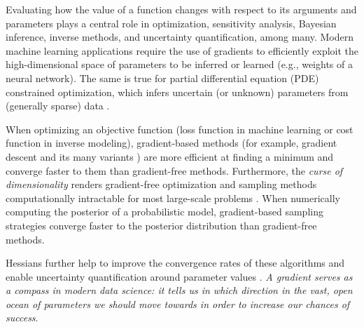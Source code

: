 % 
Evaluating how the value of a function changes with respect to its arguments and parameters plays a central role in optimization, sensitivity analysis, Bayesian inference, inverse methods, and uncertainty quantification, among many\cite{Razavi.2021}. 
Modern machine learning applications require the use of gradients to efficiently exploit  the high-dimensional space of parameters to be inferred or learned (e.g., weights of a neural network). 
The same is true for partial differential equation (PDE) constrained optimization, which infers uncertain (or unknown) parameters from (generally sparse) data  \cite{Ghattas.2021}.

When optimizing an objective function (loss function in machine learning or cost function in inverse modeling), gradient-based methods (for example, gradient descent and its many variants \cite{ruder2016overview-gradient-descent}) are more efficient at finding a minimum and converge faster to them than gradient-free methods.
Furthermore, the \textit{curse of dimensionality} renders gradient-free optimization and sampling methods computationally intractable for most large-scale problems \cite{Oden:2010tv}.
When numerically computing the posterior of a probabilistic model, gradient-based sampling strategies converge faster to the posterior distribution than gradient-free methods. 

Hessians further help to improve the convergence rates of these algorithms and enable uncertainty quantification around parameter values \cite{BuiThanh:2012ul}.
\textit{A gradient serves as a compass in modern data science: it tells us in which direction in the vast, open ocean of parameters we should move towards in order to increase our chances of success}.  


